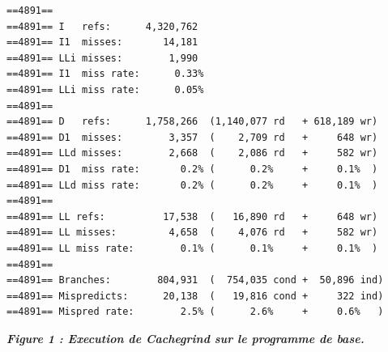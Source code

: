 \documentclass{report}
\begin{document}
\begin{scriptsize}
\begin{lstlisting}
==4891== 
==4891== I   refs:      4,320,762
==4891== I1  misses:       14,181
==4891== LLi misses:        1,990
==4891== I1  miss rate:      0.33%
==4891== LLi miss rate:      0.05%
==4891== 
==4891== D   refs:      1,758,266  (1,140,077 rd   + 618,189 wr)
==4891== D1  misses:        3,357  (    2,709 rd   +     648 wr)
==4891== LLd misses:        2,668  (    2,086 rd   +     582 wr)
==4891== D1  miss rate:       0.2% (      0.2%     +     0.1%  )
==4891== LLd miss rate:       0.2% (      0.2%     +     0.1%  )
==4891== 
==4891== LL refs:          17,538  (   16,890 rd   +     648 wr)
==4891== LL misses:         4,658  (    4,076 rd   +     582 wr)
==4891== LL miss rate:        0.1% (      0.1%     +     0.1%  )
==4891== 
==4891== Branches:        804,931  (  754,035 cond +  50,896 ind)
==4891== Mispredicts:      20,138  (   19,816 cond +     322 ind)
==4891== Mispred rate:        2.5% (      2.6%     +     0.6%   )
\end{lstlisting}
\begin{center}
\textbf{\textit{Figure 1 : Execution de Cachegrind sur le programme de base.}}
\end{center}
\end{scriptsize}
\end{document}
